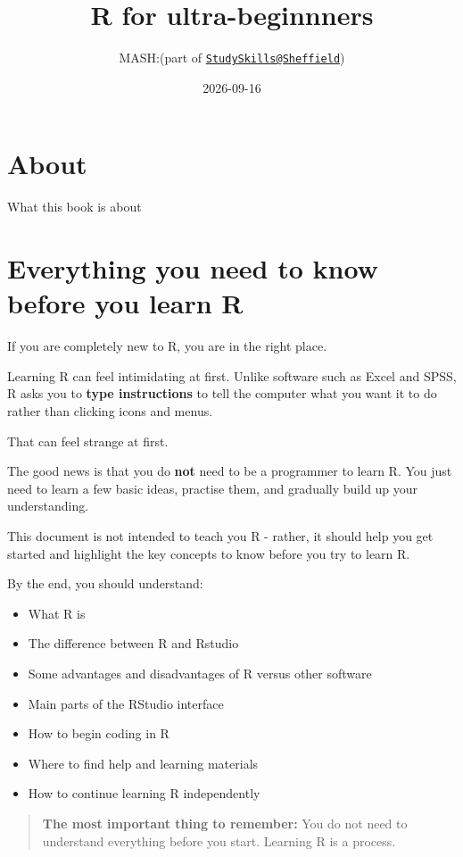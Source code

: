 \documentclass[
]{book}
\title{R for ultra-beginnners}
\author{MASH:(part of \href{mailto:StudySkills@Sheffield}{\nolinkurl{StudySkills@Sheffield}})}
\date{2026-09-16}
\providecommand{\tightlist}{%
  \setlength{\itemsep}{0pt}\setlength{\parskip}{0pt}}
\begin{document}
\maketitle

{
\setcounter{tocdepth}{1}
\tableofcontents
}
\chapter{About}\label{about}

What this book is about

\chapter{Everything you need to know before you learn R}\label{everything-you-need-to-know-before-you-learn-r}

If you are completely new to R, you are in the right place.

Learning R can feel intimidating at first. Unlike software such as Excel and SPSS, R asks you to \textbf{type instructions} to tell the computer what you want it to do rather than clicking icons and menus.

That can feel strange at first.

The good news is that you do \textbf{not} need to be a programmer to learn R. You just need to learn a few basic ideas, practise them, and gradually build up your understanding.

This document is not intended to teach you R - rather, it should help you get started and highlight the key concepts to know before you try to learn R.

By the end, you should understand:

\begin{itemize}
\tightlist
\item
  What R is
\item
  The difference between R and Rstudio
\item
  Some advantages and disadvantages of R versus other software
\item
  Main parts of the RStudio interface
\item
  How to begin coding in R
\item
  Where to find help and learning materials
\item
  How to continue learning R independently
\end{itemize}

\begin{quote}
\textbf{The most important thing to remember:} You do not need to understand everything before you start. Learning R is a process.
\end{quote}
\end{document}
